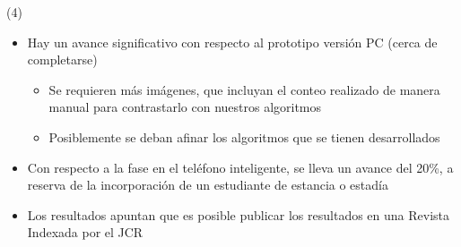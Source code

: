 \begin{frame}{ (4)}

\begin{itemize}
\item Hay un avance significativo con respecto al prototipo versión PC (cerca de completarse)
\begin{itemize} 
\item Se requieren más imágenes, que incluyan el conteo realizado de manera manual para contrastarlo con nuestros algoritmos
\item Posiblemente se deban afinar los algoritmos que se tienen desarrollados
\end{itemize}
\item Con respecto a la fase en el teléfono inteligente, se lleva un avance del 20\%, a reserva de la incorporación de un estudiante de estancia o estadía
\item Los resultados apuntan que es posible publicar los resultados en una Revista Indexada por el JCR
\end{itemize}
\end{frame}




